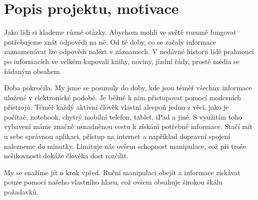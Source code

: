 \documentclass[12pt,a4paper]{article}
\begin{document}
\newpage
\pagestyle{plain}     %
\setcounter{page}{1}
\addtolength{\voffset}{-3cm}
\addtolength{\headheight}{2cm}

\pagestyle{fancy}
\lfoot{}
\cfoot{\thepage}
\rfoot{}
\renewcommand{\headrulewidth}{0.4pt}


\section*{Popis projektu, motivace}


Jako lidi si klademe různé otázky. Abychom mohli ve světě rozumě fungovat potřebujeme znát odpovědi na ně. Od té doby, co se začaly informace zaznamenávat lze odpovědi nalézt v záznamech. V nedávné historii lidé prahnoucí po informacích ve velkém kupovali knihy, noviny, jízdní řády, prostě média se žádaným obsahem. 

Doba pokročila. My jsme se posunuly do doby, kde jsou téměř všechny informace uložené v elektronické podobě. Je běžné k nim přistupovat pomocí moderních přístrojů. Téměř každý aktivní člověk vlastní alespoň jednu z věcí, jako je počítač, notebook, chytrý mobilní telefon, tablet, iPad a jiné. S využitím toho vybavení máme značně usnadněnou cestu k získání potřebné informace. Stačí mít u sebe správnou aplikaci, přístup na internet a například dopravní spojení nalezneme do minutky. Limituje nás ovšem schopnost manipulace, což při troše nešikovnosti dokáže člověka dost rozčílit.

My se snažíme jít o krok vpřed. Ruční manipulaci obejít a informace získávat pouze pomocí našeho vlastního hlasu, což ovšem obsahuje širokou škálu požadavků.  
\end{document}
